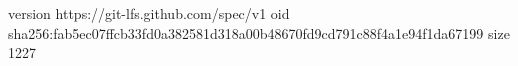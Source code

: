 version https://git-lfs.github.com/spec/v1
oid sha256:fab5ec07ffcb33fd0a382581d318a00b48670fd9cd791c88f4a1e94f1da67199
size 1227
